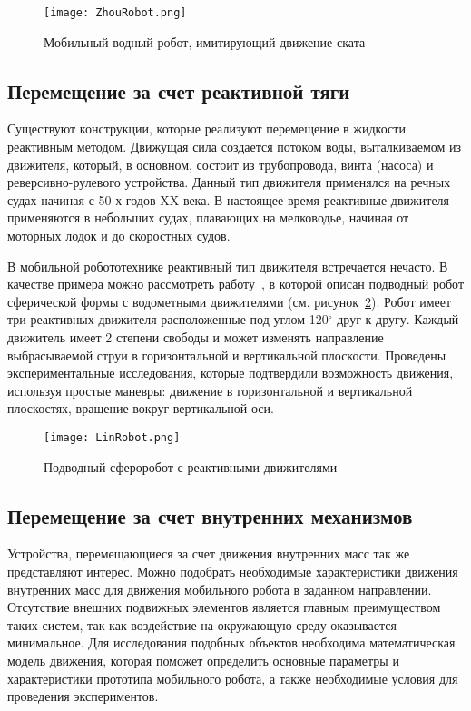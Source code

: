 \begin{figure}[h]
	\centering
	\texttt{[image: ZhouRobot.png]}%
	\caption{Мобильный водный робот, имитирующий движение ската}
	\label{ZhouRobot}
\end{figure}

\subsection{Перемещение за счет реактивной тяги}\label{sec:ch1/sec4}

Существуют конструкции, которые реализуют перемещение в жидкости реактивным методом. Движущая сила создается потоком воды, выталкиваемом из движителя, который, в основном, состоит из трубопровода, винта (насоса) и реверсивно-рулевого устройства. Данный тип движителя применялся на речных судах начиная с 50-х годов XX века. В настоящее время реактивные движителя применяются в небольших судах, плавающих на мелководье, начиная от моторных лодок и до скоростных судов.

В мобильной робототехнике реактивный тип движителя встречается нечасто. В качестве примера можно рассмотреть работу~\cite{Lin_2011}, в которой описан подводный робот сферической формы с водометными движителями (см. рисунок~\ref{LinRobot}). Робот имеет три реактивных движителя расположенные под углом 120$ ^\circ $ друг к другу. Каждый движитель имеет 2 степени свободы и может изменять направление выбрасываемой струи в горизонтальной и вертикальной плоскости. Проведены экспериментальные исследования, которые подтвердили возможность движения, используя простые маневры: движение в горизонтальной и вертикальной плоскостях, вращение вокруг вертикальной оси.

\begin{figure}[h]
	\centering
	\texttt{[image: LinRobot.png]}%
	\caption{Подводный сфероробот с реактивными движителями}
	\label{LinRobot}
\end{figure}

\subsection{Перемещение за счет внутренних механизмов}\label{sec:ch1/sec5}

Устройства, перемещающиеся за счет движения внутренних масс так же представляют интерес. Можно подобрать необходимые характеристики движения внутренних масс для движения мобильного робота в заданном направлении. Отсутствие внешних подвижных элементов является главным преимуществом таких систем, так как воздействие на окружающую среду оказывается минимальное. Для исследования подобных объектов необходима математическая модель движения, которая поможет определить основные параметры и характеристики прототипа мобильного робота, а также необходимые условия для проведения экспериментов.

